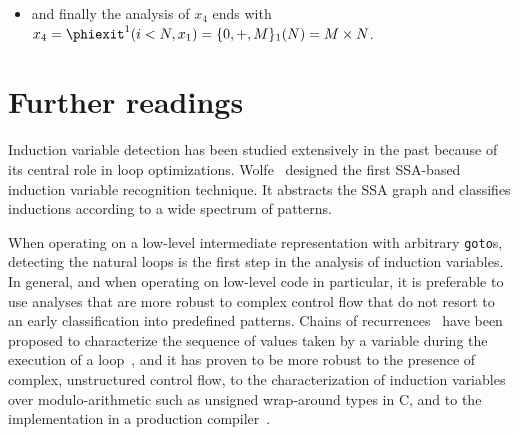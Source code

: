 {\begin{itemize}
\begin{itemize}
\begin{itemize}
    \item the analysis of $x_0$ leads to $x_0 = 0$
    \item analyzing $x_2$ triggers the analysis of $j$, $M$, and $x_3$
      \begin{itemize}
      \item $j = \CHREC{0, +, 1}_2$ i.e., the canonical loop counter $l_2$ of $\textit{loop}_2$.
      \item $M$ is a parameter
      \item $x_3 = \phientry^2 (x_1, x_3 + 1) = \CHREC{x_1, +, 1}_2$
      \end{itemize}
    \item $x_2 = \phientry^2 (j < M, x_3)$ is then computed as the last value of $x_3$ after
      $\textit{loop}_2$, i.e., it is the chain of recurrence of $x_3$ applied
      to the first iteration of $\textit{loop}_2$ that does not satisfy $j < M$ or equivalently $l_2<M$. The corresponding Diophantine inequality $l_2\geq M$  have minimum solution $l_2=M$. So, to finish the computation of the scalar evolution of
      $x_2$ we apply $M$ to the scalar evolution of $x_3$, leading
      to $x_2 = \CHREC{x_1, +, 1}_2 (M) = x_1 + M$;
    \end{itemize}
  \item the scalar evolution analysis of $x_1$ then leads to $x_1 = \phientry^1 (x_0, x_2) = \phientry^1 (x_0, x_1 + M) = \CHREC{x_0, +, M}_1 = \CHREC{0, +, M}_1$
  \end{itemize}
\item and finally the analysis of $x_4$ ends with $x_4 = \phiexit^1 (i< N, x_1) = \CHREC{0, +, M}_1 (N) = M \times N$.
\end{itemize}


\section{Further readings}

Induction variable detection has been studied extensively in the past because of its central role in loop optimizations. 
Wolfe~\cite{Wolfe92} designed the first SSA-based induction variable recognition technique. 
It abstracts the SSA graph and classifies inductions according to a wide spectrum of patterns.

When operating on a low-level intermediate representation with arbitrary \texttt{goto}s, detecting the natural loops is the first step in the analysis of induction variables. 
In general, and when operating on low-level code in particular, it is preferable to use analyses that are more robust to complex control flow that do not resort to an early classification into predefined patterns. 
Chains of recurrences~\cite{BWZ94,KMZ98,Zim01} have been proposed to characterize the sequence of values taken by a variable during the execution of a loop~\cite{vEn01}, and it has proven to be more robust to the presence of complex, unstructured control flow, to the characterization of induction variables over modulo-arithmetic such as unsigned wrap-around types in C, and to the implementation in a production compiler~\cite{Pop05}.

}
